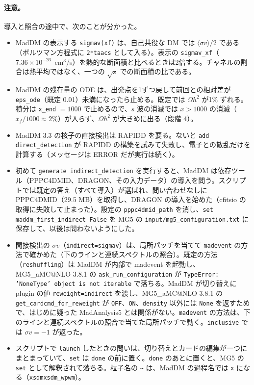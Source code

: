 \documentclass[a4paper,10pt]{ltjsarticle}
\makeatletter
\newcommand{\MGaMC}{MG5\_aMC@NLO}
\makeatother
\begin{document}
\paragraph{注意。}導入と照合の途中で、次のことが分かった。
\begin{itemize}
\item MadDM の表示する \texttt{sigmav(xf)} は、自己共役な DM では $\langle\sigma v\rangle/2$ である（ボルツマン方程式に \texttt{2*taacs} として入る）。表示の \texttt{sigmav\_xf}（$7.36\times10^{-26}$~cm$^3$/s）を熱的な断面積と比べるときは2倍する。チャネルの割合は熱平均ではなく、一つの $\sqrt s$ での断面積の比である。
\item MadDM の残存量の ODE は、出発点を1ずつ戻して前回との相対差が \texttt{eps\_ode}（既定 0.01）未満になったら止める。既定では $\Omega h^2$ が1\% ずれる。積分は \texttt{x\_end} $=1000$ で止めるので、$s$ 波の消滅では $x>1000$ の消滅（$x_f/1000\approx2$\%）が入らず、$\Omega h^2$ が大きめに出る（段階 4）。
\item MadDM 3.3 の核子の直接検出は RAPIDD を要る。ないと \texttt{add direct\_detection} が RAPIDD の構築を試みて失敗し、電子との散乱だけを計算する（メッセージは ERROR だが実行は続く）。
\item 初めて \texttt{generate indirect\_detection} を実行すると、MadDM は依存ツール（PPPC4DMID、DRAGON、その入力データ）の導入を問う。スクリプトでは既定の答え（すべて導入）が選ばれ、問い合わせなしに PPPC4DMID（29.5 MB）を取得し、DRAGON の導入を始めた（cfitsio の取得に失敗して止まった）。設定の \texttt{pppc4dmid\_path} を消し、\texttt{set maddm\_first\_indirect False} を MG5 の \texttt{input/mg5\_configuration.txt} に保存して、以後は問わないようにした。
\item 間接検出の $\sigma v$（\texttt{indirect=sigmav}）は、局所パッチを当てて \texttt{madevent} の方法で確かめた（下のラインと連続スペクトルの照合）。既定の方法（\texttt{reshuffling}）は MadDM が内部で madevent を起動し、\MGaMC{} 3.8.1 の \texttt{ask\_run\_configuration} が \texttt{TypeError: 'NoneType' object is not iterable} で落ちる。MadDM が切り替えに plugin の値 \texttt{reweight=indirect} を渡し、\MGaMC{} 3.8.1 の \texttt{get\_cardcmd\_for\_reweight} が \texttt{OFF}、\texttt{ON}、\texttt{density} 以外には \texttt{None} を返すためで、はじめに疑った MadAnalysis5 とは関係がない。\texttt{madevent} の方法は、下のラインと連続スペクトルの照合で当てた局所パッチで動く。\texttt{inclusive} では $\sigma v=-1$ が返った。
\item スクリプトで \texttt{launch} したときの問いは、切り替えとカードの編集が一つにまとまっていて、\texttt{set} は \texttt{done} の前に置く。\texttt{done} のあとに置くと、MG5 の \texttt{set} として解釈されて落ちる。粒子名の \texttt{\textasciitilde} は、MadDM の過程名では \texttt{x} になる（\texttt{xsdmxsdm\_wpwm}）。
\end{itemize}
\end{document}
